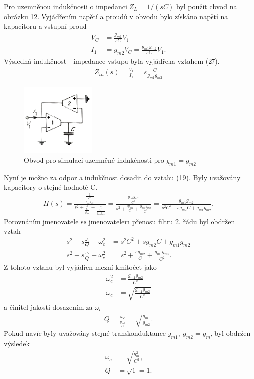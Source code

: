 \documentclass[twoside]{article}
\begin{document}
\noindent Pro uzemněnou indukčnosti o impedanci $Z_L = 1/(sC)$ byl použit obvod na obrázku 12. Vyjádřením napětí a proudů v obvodu bylo získáno napětí na kapacitoru a vstupní proud
\begin{align}
V_C &= \frac{g_{m1}}{sC}V_1 \\
I_1 &= g_{m2}V_C = \frac{g_{m1}g_{m2}}{sC}V_1.
\end{align}
Výsledná indukčnost - impedance vstupu byla vyjádřena vztahem (27).
\begin{align}
Z_{in}(s) = \frac{V_1}{I_1} = s\frac{C}{g_{m1}g_{m2}}
\end{align}
\begin{figure}[H]
\centering
\includegraphics[scale=1]{image12.png}
\caption{Obvod pro simulaci uzemněné indukčnosti pro $g_{m1} = g_{m2}$\cite{8}}
\end{figure}
\noindent Nyní je možno za odpor a indukčnost dosadit do vztahu (19). Byly uvažovány kapacitory o stejné hodnotě C.
\begin{align}
H(s) = \frac{\frac{1}{\frac{C^2}{g_{m1}g_{m2}}}}{s^2 + \frac{s}{\frac{C}{g_{m2}}} + \frac{1}{\frac{C^2}{g_{m1}g_{m2}}}} = \frac{\frac{g_{m1}g_{m2}}{C^2}}{s^2 + \frac{sg_{m2}}{C} + \frac{g_{m1}g_{m2}}{C^2}} = \frac{g_{m1}g_{m2}}{s^2C^2 + sg_{m2}C + g_{m1}g_{m2}}.
\end{align}
Porovnáním jmenovatele se jmenovatelem přenosu filtru 2. řádu byl obdržen vztah
\begin{align}
s^2 + s\frac{\omega _c}{Q} + \omega _c^2 &= s^2C^2 + sg_{m2}C + g_{m1}g_{m2}\\
s^2 + s\frac{\omega _c}{Q} + \omega _c^2 &= s^2 + \frac{sg_{m2}}{C} + \frac{g_{m1}g_{m2}}{C^2}.
\end{align}
Z tohoto vztahu byl vyjádřen mezní kmitočet jako 
\begin{align}
\omega _c^2 &= \frac{g_{m1}g_{m2}}{C^2} \\
\omega _c &= \sqrt{\frac{g_{m1}g_{m2}}{C^2}}
\end{align}
a činitel jakosti dosazením za $\omega _c$
\begin{align}
Q = \frac{\omega _c}{\frac{g_{m2}}{C}} = \sqrt{\frac{g_{m1}}{g_{m2}}}.
\end{align}
Pokud navíc byly uvažovány stejné transkonduktance $g_{m1}, \ g_{m2} = g_m$, byl obdržen výsledek
\begin{align}
\omega _c &= \sqrt{\frac{g_m^2}{C^2}},\\
Q &= \sqrt{1} = 1.
\end{align}
\end{document}
